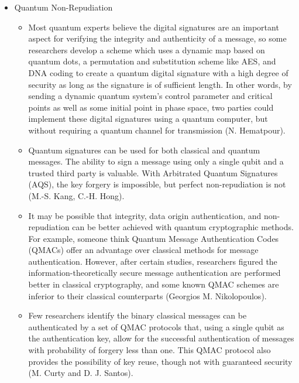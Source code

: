 \documentclass[sigconf]{acmart}
\begin{document}
\begin{itemize}
\item Quantum Non-Repudiation
	\begin{itemize}
	\item Most quantum experts believe the digital signatures are an important aspect for verifying the integrity and authenticity of a message, so some researchers develop a scheme which uses a dynamic map based on quantum dots, a permutation and substitution scheme like AES, and DNA coding to create a quantum digital signature with a high degree of security as long as the signature is of sufficient length. In other words, by sending a dynamic quantum system's control parameter and critical points as well as some initial point in phase space, two parties could implement these digital signatures using a quantum computer, but without requiring a quantum channel for transmission (N. Hematpour).
	\item Quantum signatures can be used for both classical and quantum messages. The ability to sign a message using only a single qubit and a trusted third party is valuable.  With Arbitrated Quantum Signatures (AQS), the key forgery is impossible, but perfect non-repudiation is not (M.-S. Kang, C.-H. Hong).
	\item It may be possible that integrity, data origin authentication, and non-repudiation can be better achieved with quantum cryptographic methods. For example, someone think Quantum Message Authentication Codes (QMACs) offer an advantage over classical methods for message authentication. However, after certain studies, researchers figured the information-theoretically secure message authentication are performed better in classical cryptography, and some known QMAC schemes are inferior to their classical counterparts (Georgios M. Nikolopoulos).
	\item Few researchers identify the binary classical messages can be authenticated by a set of QMAC protocols that, using a single qubit as the authentication key, allow for the successful authentication of messages with probability of forgery less than one. This QMAC protocol also provides the possibility of key reuse, though not with guaranteed security (M. Curty and D. J. Santos).
	\end{itemize}


\end{itemize}
\end{document}
